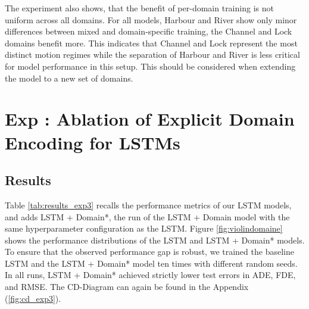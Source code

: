         The experiment also shows, that the benefit of per-domain training is not uniform across all domains. For all models, Harbour and River show only minor differences between mixed and domain-specific training, the Channel and Lock domains benefit more. This indicates that Channel and Lock represent the most distinct motion regimes while the separation of Harbour and River is less critical for model performance in this setup. This should be considered when extending the model to a new set of domains.


        \section[Exp. \Romannum{3}: LSTM Domain Encoding]{Exp : Ablation of Explicit Domain Encoding for LSTMs}
        \label{sec:exp3}
        \subsection{Results}
        Table \ref{tab:results_exp3} recalls the performance metrics of our \ac{LSTM} models, and adds LSTM + Domain*, the run of the LSTM + Domain model with the same hyperparameter configuration as the LSTM.
        Figure \ref{fig:violindomaine} shows the performance distributions of the \ac{LSTM} and LSTM + Domain* models.
        To ensure that the observed performance gap is robust, we trained the baseline LSTM and the LSTM + Domain* model ten times with different random seeds. In all runs, LSTM + Domain* achieved strictly lower test errors in ADE, FDE, and RMSE. %
        The CD-Diagram can again be found in the Appendix (\ref{fig:cd_exp3}).
    

